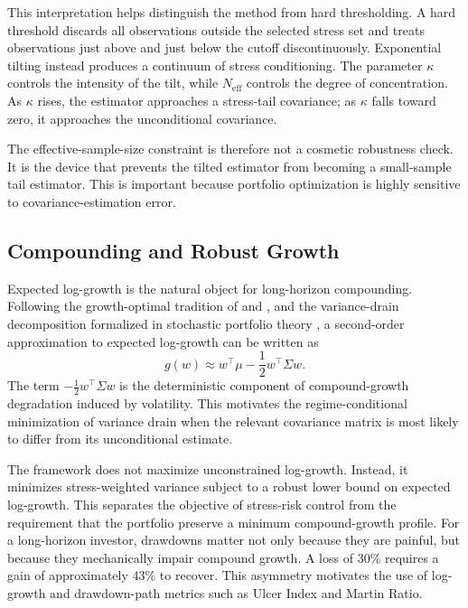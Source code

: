 \documentclass[11pt]{article}
\begin{document}
This interpretation helps distinguish the method from hard thresholding. A hard threshold discards all observations outside the selected stress set and treats observations just above and just below the cutoff discontinuously. Exponential tilting instead produces a continuum of stress conditioning. The parameter $\kappa$ controls the intensity of the tilt, while $N_{\mathrm{eff}}$ controls the degree of concentration. As $\kappa$ rises, the estimator approaches a stress-tail covariance; as $\kappa$ falls toward zero, it approaches the unconditional covariance.

The effective-sample-size constraint is therefore not a cosmetic robustness check. It is the device that prevents the tilted estimator from becoming a small-sample tail estimator. This is important because portfolio optimization is highly sensitive to covariance-estimation error.

\subsection{Compounding and Robust Growth}

Expected log-growth is the natural object for long-horizon compounding. Following the growth-optimal tradition of \citet{kelly1956} and \citet{latane1959}, and the variance-drain decomposition formalized in stochastic portfolio theory \citep{fernholz2002}, a second-order approximation to expected log-growth can be written as
\begin{equation}
g(w) \approx w^\top \mu - \frac{1}{2} w^\top \Sigma w.
\end{equation}
The term $-\frac{1}{2}w^\top \Sigma w$ is the deterministic component of compound-growth degradation induced by volatility. This motivates the regime-conditional minimization of variance drain when the relevant covariance matrix is most likely to differ from its unconditional estimate.

The framework does not maximize unconstrained log-growth. Instead, it minimizes stress-weighted variance subject to a robust lower bound on expected log-growth. This separates the objective of stress-risk control from the requirement that the portfolio preserve a minimum compound-growth profile. For a long-horizon investor, drawdowns matter not only because they are painful, but because they mechanically impair compound growth. A loss of 30\% requires a gain of approximately 43\% to recover. This asymmetry motivates the use of log-growth and drawdown-path metrics such as Ulcer Index and Martin Ratio.
\end{document}
